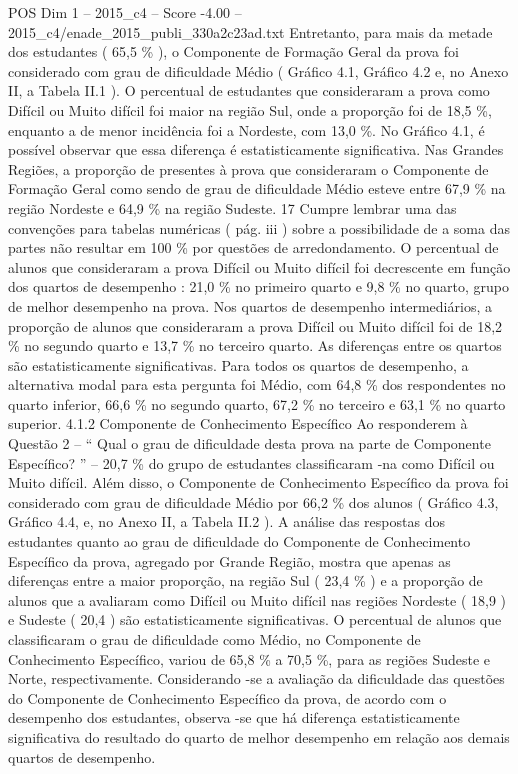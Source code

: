 \begin{textsample}{POS Dim 1 – 2015\_c4 – Score -4.00 – 2015\_c4/enade\_2015\_publi\_330a2c23ad.txt}
Entretanto, para mais da metade dos estudantes ( 65,5 \% ), o Componente de Formação Geral da prova foi considerado com grau de dificuldade Médio ( Gráfico 4.1, Gráfico 4.2 e, no Anexo II, a Tabela II.1 ).
O percentual de estudantes que consideraram a prova como Difícil ou Muito difícil foi maior na região Sul, onde a proporção foi de 18,5 \%, enquanto a de menor incidência foi a Nordeste, com 13,0 \%.
No Gráfico 4.1, é possível observar que essa diferença é estatisticamente significativa.
Nas Grandes Regiões, a proporção de presentes à prova que consideraram o Componente de Formação Geral como sendo de grau de dificuldade Médio esteve entre 67,9 \% na região Nordeste e 64,9 \% na região Sudeste. 17 Cumpre lembrar uma das convenções para tabelas numéricas ( pág. iii ) sobre a possibilidade de a soma das partes não resultar em 100 \% por questões de arredondamento.
O percentual de alunos que consideraram a prova Difícil ou Muito difícil foi decrescente em função dos quartos de desempenho : 21,0 \% no primeiro quarto e 9,8 \% no quarto, grupo de melhor desempenho na prova.
Nos quartos de desempenho intermediários, a proporção de alunos que consideraram a prova Difícil ou Muito difícil foi de 18,2 \% no segundo quarto e 13,7 \% no terceiro quarto.
As diferenças entre os quartos são estatisticamente significativas.
Para todos os quartos de desempenho, a alternativa modal para esta pergunta foi Médio, com 64,8 \% dos respondentes no quarto inferior, 66,6 \% no segundo quarto, 67,2 \% no terceiro e 63,1 \% no quarto superior. 4.1.2 Componente de Conhecimento Específico Ao responderem à Questão 2 – “ Qual o grau de dificuldade desta prova na parte de Componente Específico? ” – 20,7 \% do grupo de estudantes classificaram -na como Difícil ou Muito difícil.
Além disso, o Componente de Conhecimento Específico da prova foi considerado com grau de dificuldade Médio por 66,2 \% dos alunos ( Gráfico 4.3, Gráfico 4.4, e, no Anexo II, a Tabela II.2 ).
A análise das respostas dos estudantes quanto ao grau de dificuldade do Componente de Conhecimento Específico da prova, agregado por Grande Região, mostra que apenas as diferenças entre a maior proporção, na região Sul ( 23,4 \% ) e a proporção de alunos que a avaliaram como Difícil ou Muito difícil nas regiões Nordeste ( 18,9 ) e Sudeste ( 20,4 ) são estatisticamente significativas.
O percentual de alunos que classificaram o grau de dificuldade como Médio, no Componente de Conhecimento Específico, variou de 65,8 \% a 70,5 \%, para as regiões Sudeste e Norte, respectivamente.
Considerando -se a avaliação da dificuldade das questões do Componente de Conhecimento Específico da prova, de acordo com o desempenho dos estudantes, observa -se que há diferença estatisticamente significativa do resultado do quarto de melhor desempenho em relação aos demais quartos de desempenho.

\end{textsample}
